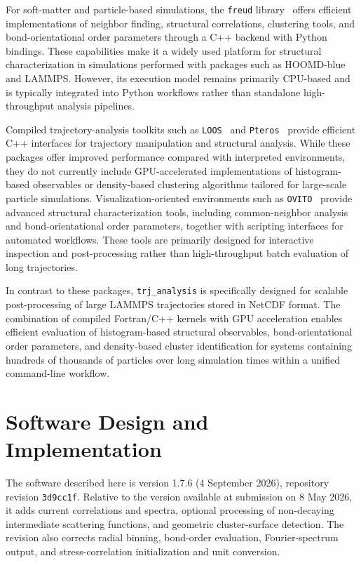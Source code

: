\documentclass[final,1p,times]{elsarticle}
\begin{document}
For soft-matter and particle-based simulations, the \texttt{freud}
library~\cite{freud2020} offers efficient implementations of neighbor
finding, structural correlations, clustering tools, and
bond-orientational order parameters through a C++ backend with Python
bindings. These capabilities make it a widely used platform for
structural characterization in simulations performed with packages
such as HOOMD-blue \cite{Anderson2020} and LAMMPS. However, its execution model remains primarily CPU-based and is typically integrated into Python workflows rather than standalone high-throughput analysis pipelines.

Compiled trajectory-analysis toolkits such as \texttt{LOOS}~\cite{LOOS2012} and \texttt{Pteros}~\cite{Pteros2019} provide efficient C++ interfaces for trajectory manipulation and structural analysis. While these packages offer improved performance compared with interpreted environments, they do not currently include GPU-accelerated implementations of histogram-based observables or density-based clustering algorithms tailored for large-scale particle simulations. Visualization-oriented environments such as \texttt{OVITO}~\cite{OVITO2025} provide advanced structural characterization tools, including common-neighbor analysis and bond-orientational order parameters, together with scripting interfaces for automated workflows. These tools are primarily designed for interactive inspection and post-processing rather than high-throughput batch evaluation of long trajectories.

In contrast to these packages, \texttt{trj\_analysis} is specifically designed for scalable post-processing of large LAMMPS trajectories stored in NetCDF format. The combination of compiled Fortran/C++ kernels with GPU acceleration enables efficient evaluation of histogram-based structural observables, bond-orientational order parameters, and density-based cluster identification for systems containing hundreds of thousands of particles over long simulation times within a unified command-line workflow.

\section{Software Design and Implementation}

The software described here is version 1.7.6 (4 September 2026),
repository revision \texttt{3d9cc1f}. Relative to the version available
at submission on 8 May 2026, it adds current correlations and spectra,
optional processing of non-decaying intermediate scattering functions,
and geometric cluster-surface detection. The revision also corrects
radial binning, bond-order evaluation, Fourier-spectrum output, and
stress-correlation initialization and unit conversion.
\end{document}
